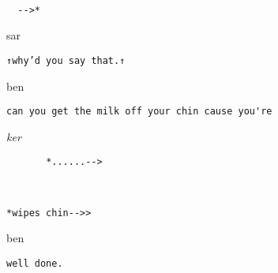 \documentclass[output=paper,nonflat,modfont,draft]{langsci/langscibook}
\begin{document}
\begin{transbox}{7}{~}
\begin{verbatim}
  -->*
\end{verbatim}
\end{transbox}

\begin{transbox}{8}{sar}
\begin{verbatim}
↑why’d you say that.↑
\end{verbatim}
\end{transbox}\smallskip


\begin{mdframedkendrick}[style=firstfoc]
\begin{transbox}{1}{ben}
\begin{verbatim}
can you get the milk off your chin cause you're
\end{verbatim}
\end{transbox}
\end{mdframedkendrick}\vspace{-5mm}



\begin{transbox}{4}{\textit{ker}}
\begin{verbatim}
       *......-->
\end{verbatim}
\end{transbox}


\begin{mdframedkendrick}[style=secondfoc]
\begin{transbox}{6}{~}
\begin{verbatim}
*wipes chin-->>
\end{verbatim}
\end{transbox}
\end{mdframedkendrick}\vspace{-5mm}

\begin{transbox}{7}{ben}
\begin{verbatim}
well done.
\end{verbatim}
\end{transbox}\bigskip
\end{document}
